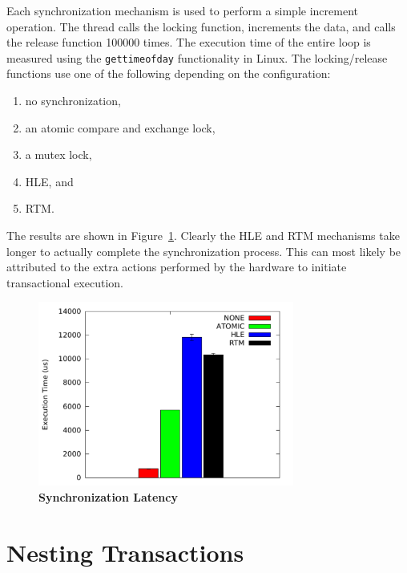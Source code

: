 \documentclass[11pt]{book}
\begin{document}
Each synchronization mechanism is used to perform a simple increment operation.  The
thread calls the locking function, increments the data, and calls the release function
100000 times.  The execution time of the entire loop is measured using the
\texttt{gettimeofday} functionality in Linux.  The locking/release functions use one of
the following depending on the configuration:

\vspace*{-\bigskipamount}
\begin{singlespace}
\begin{enumerate}
  \item no synchronization,
  \item an atomic compare and exchange lock,
  \item a mutex lock,
  \item HLE, and
  \item RTM.
\end{enumerate}
\end{singlespace}

\noindent
The results are shown in Figure~\ref{fig:tsx_latency}.  Clearly the HLE and RTM mechanisms
take longer to actually complete the synchronization process.  This can most likely be
attributed to the extra actions performed by the hardware to initiate transactional
execution.

\begin{figure}
    \centering
    \graphicspath{ {./figures/} }
    \includegraphics[width=0.75\textwidth,keepaspectratio]{SyncBM}
    \caption{\textbf{Synchronization Latency}}\label{fig:tsx_latency}
\end{figure}

\section{Nesting Transactions}
\end{document}
